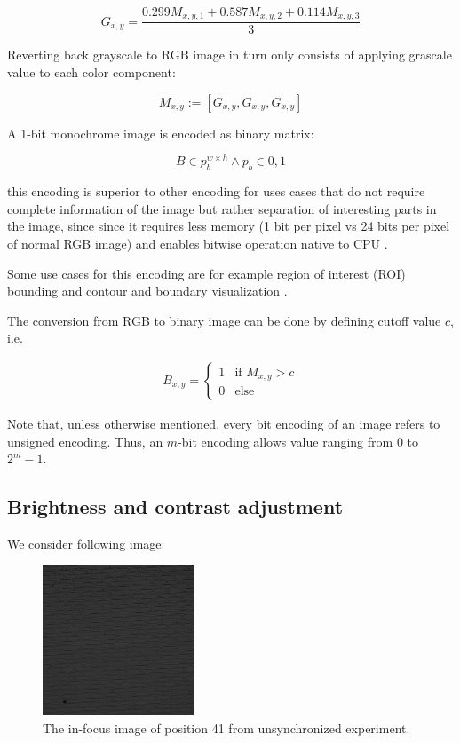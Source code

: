 \documentclass[pdftex,12pt,a4paper]{report}
\begin{document}
\begin{equation}
\label{equation:rgb_to_gray_def}
G_{x, y} = \frac{0.299 M_{x, y, 1} + 0.587  M_{x, y, 2} + 0.114 M_{x, y, 3}}{3}
\end{equation}

Reverting back grayscale to RGB image in turn only consists of applying grascale value to each color component:

$$
M_{x, y} := [G_{x, y}, G_{x, y}, G_{x, y}]
$$

A 1-bit monochrome image is encoded as binary matrix:

$$
B \in p_b^{w \times h} \land p_b \in {0, 1}
$$

this encoding is superior to other encoding for uses cases that do not require complete information of the image but rather separation of interesting parts in the image, since since it requires less memory (1 bit per pixel vs 24 bits per pixel of normal RGB image) and enables bitwise operation native to CPU \cite{kernighan1988c}. 

Some use cases for this encoding are for example region of interest (ROI) bounding and contour and boundary visualization \cite{hartley2003multiple}.

The conversion from RGB to binary image can be done by defining cutoff value $c$, i.e.

\begin{gather*}
B_{x, y} =
\begin{cases}
  1 & \text{if } M_{x, y} > c\\    
  0 & \text{else}  
\end{cases}
\end{gather*}

Note that, unless otherwise mentioned, every bit encoding of an image refers to unsigned encoding. Thus, an $m$-bit encoding allows value ranging from $0$ to $2^m - 1$.

\subsection{Brightness and contrast adjustment}

We consider following image: 

\begin{figure}[H]
\centering
\includegraphics[width=0.4\textwidth]{images/pos_41_in_t0}
\caption{The in-focus image of position 41 from unsynchronized experiment.}
\label{fig:pos41}
\end{figure}
\end{document}
